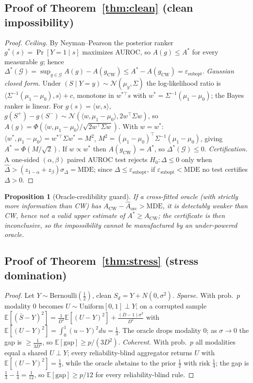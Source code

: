 \documentclass[11pt]{article}
\newtheorem{proposition}{Proposition}
\begin{document}
\subsection{Proof of Theorem~\ref{thm:clean} (clean impossibility)}
\begin{proof}
\emph{Ceiling.} By Neyman--Pearson the posterior ranker $g^{*}(s)=\Pr[Y{=}1\mid s]$
maximizes AUROC, so $A(g)\le A^{*}$ for every measurable $g$; hence
$\Delta^{*}(\mathcal{G})=\sup_{g\in\mathcal G}A(g)-A(g_{\mathrm{CW}})
\le A^{*}-A(g_{\mathrm{CW}})=\varepsilon_{\mathrm{subopt}}$.
\emph{Gaussian closed form.} Under $(S\mid Y{=}y)\sim\mathcal N(\mu_y,\Sigma)$ the
log-likelihood ratio is $\langle \Sigma^{-1}(\mu_1-\mu_0),s\rangle+c$, monotone in
$w^{*\top}s$ with $w^{*}=\Sigma^{-1}(\mu_1-\mu_0)$; the Bayes ranker is linear. For
$g(s)=\langle w,s\rangle$, $g(S^+)-g(S^-)\sim\mathcal N(\langle w,\mu_1-\mu_0\rangle,
2w^\top\Sigma w)$, so $A(g)=\Phi(\langle w,\mu_1-\mu_0\rangle/\sqrt{2w^\top\Sigma w})$.
With $w=w^{*}$: $\langle w^{*},\mu_1-\mu_0\rangle=w^{*\top}\Sigma w^{*}=M^{2}$,
$M^{2}=(\mu_1-\mu_0)^\top\Sigma^{-1}(\mu_1-\mu_0)$, giving $A^{*}=\Phi(M/\sqrt2)$. If
$w\propto w^{*}$ then $A(g_{\mathrm{CW}})=A^{*}$, so $\Delta^{*}(\mathcal G)\le 0$.
\emph{Certification.} A one-sided $(\alpha,\beta)$ paired AUROC test rejects
$H_0:\Delta\le0$ only when $\hat\Delta>(z_{1-\alpha}+z_{\beta})\sigma_\Delta=\mathrm{MDE}$;
since $\Delta\le\varepsilon_{\mathrm{subopt}}$, if $\varepsilon_{\mathrm{subopt}}<\mathrm{MDE}$
no test certifies $\Delta>0$.
\end{proof}

\begin{proposition}[Oracle-credibility guard]
If a cross-fitted oracle (with strictly more information than CW) has
$A_{\mathrm{CW}}-\hat A_{\mathrm{orc}}>\mathrm{MDE}$, it is detectably weaker than CW,
hence not a valid upper estimate of $A^{*}\ge A_{\mathrm{CW}}$; the certificate is then
\emph{inconclusive}, so the impossibility cannot be manufactured by an under-powered
oracle.
\end{proposition}

\subsection{Proof of Theorem~\ref{thm:stress} (stress domination)}
\begin{proof}
Let $Y\sim\mathrm{Bernoulli}(\tfrac12)$, clean $S_d=Y+N(0,\sigma^2)$.
\emph{Sparse.} With prob.\ $p$ modality $0$ becomes $U\sim\mathrm{Uniform}[0,1]\perp Y$;
on a corrupted sample $\mathbb E[(\bar S-Y)^2]=\tfrac1{D^2}\mathbb E[(U-Y)^2]
+\tfrac{(D-1)\sigma^2}{D^2}$ with $\mathbb E[(U-Y)^2]=\int_0^1(u-Y)^2du=\tfrac13$. The
oracle drops modality $0$; as $\sigma\to0$ the gap is $\ge\tfrac1{3D^2}$, so
$\mathbb E[\mathrm{gap}]\ge p/(3D^2)$.
\emph{Coherent.} With prob.\ $p$ all modalities equal a shared $U\perp Y$; every
reliability-blind aggregator returns $U$ with $\mathbb E[(U-Y)^2]=\tfrac13$, while the
oracle abstains to the prior $\tfrac12$ with risk $\tfrac14$; the gap is
$\tfrac13-\tfrac14=\tfrac1{12}$, so $\mathbb E[\mathrm{gap}]\ge p/12$ for every
reliability-blind rule.
\end{proof}
\end{document}
